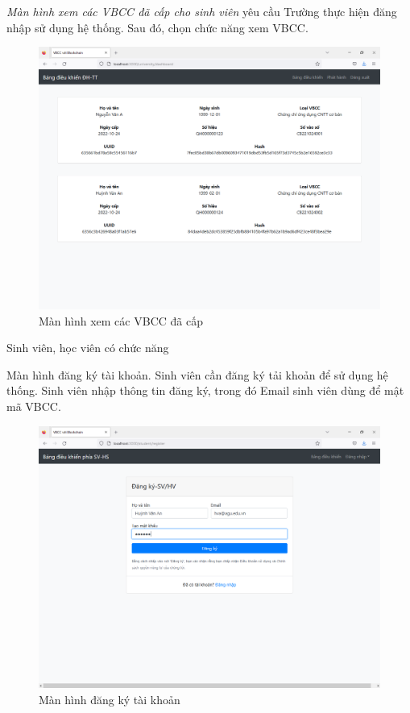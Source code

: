 \emph{Màn hình xem các VBCC đã cấp cho sinh viên}  yêu cầu Trường thực hiện đăng nhập sử dụng hệ thống. Sau đó,  chọn chức năng xem VBCC. 

\begin{figure}[H]
\centering
\includegraphics[width=.9\linewidth]{img/tt_dacap.PNG}
\caption{Màn hình xem các VBCC đã cấp}
\label{fig:tt_dacap}
\end{figure}


Sinh viên, học viên có chức năng

Màn hình đăng ký tài khoản.
Sinh viên cần đăng ký tải khoản để sử dụng hệ thống.
Sinh viên nhập thông tin đăng ký, trong đó Email sinh viên dùng để mật mã VBCC.

\begin{figure}[H]
\centering
\includegraphics[width=.9\linewidth]{img/std_new.PNG}
\caption{Màn hình đăng ký tài khoản}
\label{fig:std_new}
\end{figure}


